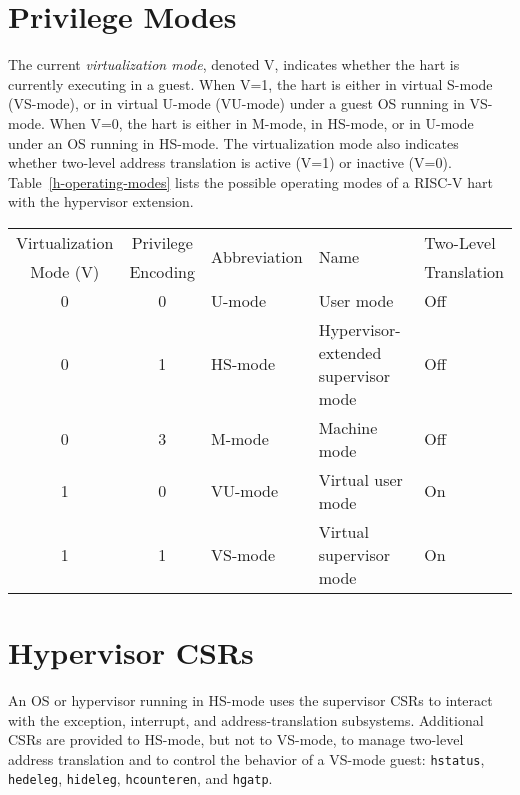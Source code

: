 \section{Privilege Modes}

The current {\em virtualization mode}, denoted V, indicates whether the hart
is currently executing in a guest.
When V=1, the hart is either in virtual S-mode (VS-mode), or in virtual U-mode
(VU-mode) under a guest OS running in VS-mode.
When V=0, the hart is either in M-mode, in HS-mode, or in U-mode under an OS
running in HS-mode.
The virtualization mode also indicates whether two-level address translation
is active (V=1) or inactive (V=0).  Table~\ref{h-operating-modes} lists the
possible operating modes of a RISC-V hart with the hypervisor extension.

\begin{table*}[h!]
\begin{center}
\begin{tabular}{|c|c||l|l|l|}
  \hline
   Virtualization & Privilege & \multirow{2}{*}{Abbreviation} & \multirow{2}{*}{Name} & Two-Level \\
   Mode (V)       & Encoding  &                               &                       & Translation \\ \hline
   0              & 0         & U-mode  & User mode & Off \\
   0              & 1         & HS-mode & Hypervisor-extended supervisor mode & Off \\
   0              & 3         & M-mode  & Machine mode & Off \\
  \hline
   1              & 0         & VU-mode & Virtual user mode & On \\
   1              & 1         & VS-mode & Virtual supervisor mode & On \\
  \hline
 \end{tabular}
\end{center}
\caption{Operating modes with the hypervisor extension.}
\label{h-operating-modes}
\end{table*}

\section{Hypervisor CSRs}

An OS or hypervisor running in HS-mode uses the supervisor CSRs to interact with the exception,
interrupt, and address-translation subsystems.
Additional CSRs are provided to HS-mode, but not to VS-mode, to manage
two-level address translation and to control the behavior of a VS-mode guest:
{\tt hstatus}, {\tt hedeleg}, {\tt hideleg}, {\tt hcounteren}, and
{\tt hgatp}.

